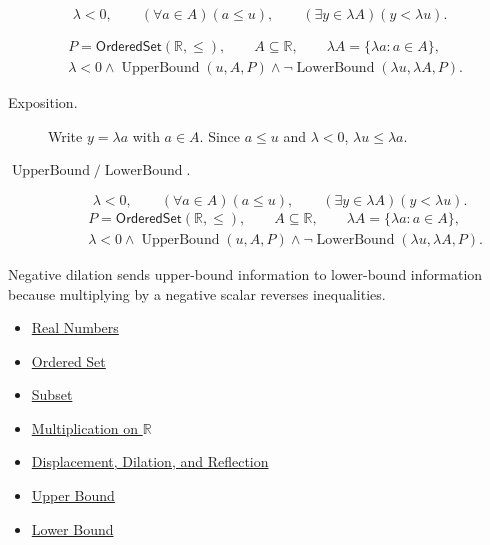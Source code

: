 \begin{remark*}
\[
\lambda<0,\qquad(\forall a\in A)(a\leq u),\qquad
(\exists y\in\lambda A)(y<\lambda u).
\]
\end{remark*}

\begin{remark*}
\[
\begin{aligned}
&P=\mathsf{OrderedSet}(\mathbb{R},\leq),\qquad
A\subseteq\mathbb{R},\qquad \lambda A=\{\lambda a:a\in A\},\\
&\lambda<0\land\operatorname{UpperBound}(u,A,P)\land
\neg\operatorname{LowerBound}(\lambda u,\lambda A,P).
\end{aligned}
\]
\end{remark*}

\begin{remark*}
\begin{description}
\item[Exposition.]
Write $y=\lambda a$ with $a\in A$.  Since $a\leq u$ and $\lambda<0$,
$\lambda u\leq\lambda a$.


  \item[\(\operatorname{UpperBound} / \operatorname{LowerBound}.\)]
  \[
\lambda<0,\qquad(\forall a\in A)(a\leq u),\qquad
(\exists y\in\lambda A)(y<\lambda u).
\]
\[
\begin{aligned}
&P=\mathsf{OrderedSet}(\mathbb{R},\leq),\qquad
A\subseteq\mathbb{R},\qquad \lambda A=\{\lambda a:a\in A\},\\
&\lambda<0\land\operatorname{UpperBound}(u,A,P)\land
\neg\operatorname{LowerBound}(\lambda u,\lambda A,P).
\end{aligned}
\]
\end{description}
\end{remark*}

\begin{remark*}[Interpretation]
Negative dilation sends upper-bound information to lower-bound information
because multiplying by a negative scalar reverses inequalities.
\end{remark*}

\begin{dependencies}
\begin{itemize}
  \item \hyperref[def:reals]{Real Numbers}
  \item \hyperref[def:ordered-set]{Ordered Set}
  \item \hyperref[def:subset]{Subset}
  \item \hyperref[def:multiplication-on-r]{Multiplication on $\mathbb{R}$}
  \item \hyperref[def:displacement-dilation-reflection]{Displacement, Dilation, and Reflection}
  \item \hyperref[def:real-upper-bound]{Upper Bound}
  \item \hyperref[def:real-lower-bound]{Lower Bound}
\end{itemize}
\end{dependencies}

